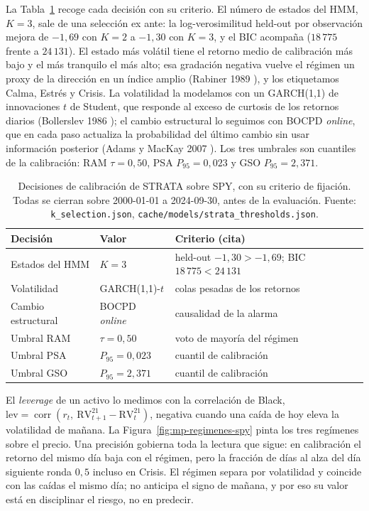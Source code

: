 La Tabla~\ref{tab:mp-calib} recoge cada decisión con su criterio. El número de estados del HMM, $K = 3$, sale de una selección ex ante: la log-verosimilitud held-out por observación mejora de $-1{,}69$ con $K = 2$ a $-1{,}30$ con $K = 3$, y el BIC acompaña ($18\,775$ frente a $24\,131$). El estado más volátil tiene el retorno medio de calibración más bajo y el más tranquilo el más alto; esa gradación negativa vuelve el régimen un proxy de la dirección en un índice amplio (Rabiner 1989 \cite{rabiner1989}), y los etiquetamos Calma, Estrés y Crisis. La volatilidad la modelamos con un GARCH(1,1) de innovaciones $t$ de Student, que responde al exceso de curtosis de los retornos diarios (Bollerslev 1986 \cite{bollerslev1986}); el cambio estructural lo seguimos con BOCPD \emph{online}, que en cada paso actualiza la probabilidad del último cambio sin usar información posterior (Adams y MacKay 2007 \cite{adams2007}). Los tres umbrales son cuantiles de la calibración: RAM $\tau = 0{,}50$, PSA $P_{95} = 0{,}023$ y GSO $P_{95} = 2{,}371$.

\begin{table}[htbp]
\centering
\caption{Decisiones de calibración de STRATA sobre SPY, con su criterio de fijación. Todas se cierran sobre 2000-01-01 a 2024-09-30, antes de la evaluación. Fuente: \texttt{k\_selection.json}, \texttt{cache/models/strata\_thresholds.json}.}
\label{tab:mp-calib}
\begin{tabular}{lll}
\toprule
Decisión & Valor & Criterio (cita) \\
\midrule
Estados del HMM & $K = 3$ & held-out $-1{,}30 > -1{,}69$; BIC $18\,775 < 24\,131$ \cite{rabiner1989} \\
Volatilidad & GARCH(1,1)-$t$ & colas pesadas de los retornos \cite{bollerslev1986} \\
Cambio estructural & BOCPD \emph{online} & causalidad de la alarma \cite{adams2007} \\
Umbral RAM & $\tau = 0{,}50$ & voto de mayoría del régimen \\
Umbral PSA & $P_{95} = 0{,}023$ & cuantil de calibración \\
Umbral GSO & $P_{95} = 2{,}371$ & cuantil de calibración \\
\bottomrule
\end{tabular}
\end{table}

El \emph{leverage} de un activo lo medimos con la correlación de Black, $\mathrm{lev} = \operatorname{corr}(r_t,\ \mathrm{RV}^{21}_{t+1} - \mathrm{RV}^{21}_t)$, negativa cuando una caída de hoy eleva la volatilidad de mañana. La Figura~\ref{fig:mp-regimenes-spy} pinta los tres regímenes sobre el precio. Una precisión gobierna toda la lectura que sigue: en calibración el retorno del mismo día baja con el régimen, pero la fracción de días al alza del día siguiente ronda $0{,}5$ incluso en Crisis. El régimen separa por volatilidad y coincide con las caídas el mismo día; no anticipa el signo de mañana, y por eso su valor está en disciplinar el riesgo, no en predecir.

